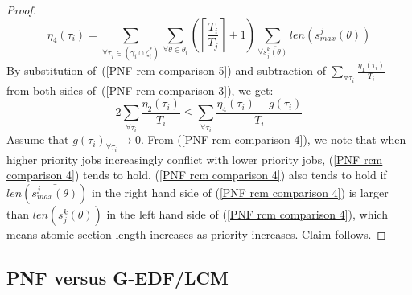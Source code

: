 \documentclass[12pt,english]{report}
\newtheorem{proof}{Proof}
\begin{document}
\begin{proof}
\begin{equation*}
\eta_{4}(\tau_{i})=\sum_{\forall\tau_{j}\in(\gamma_{i}\cap\zeta_{i}^{*})}\sum_{\forall\theta\in\theta_{i}}\left(\left\lceil \frac{T_{i}}{T_{j}}\right\rceil +1\right)\sum_{\forall\bar{s_{j}^{k}(\theta)}}len\left(s_{max}^{j}(\theta)\right)
\end{equation*}
%
By substitution of~(\ref{PNF rcm comparison 5}) and subtraction of $\sum_{\forall \tau_i} \frac{\eta_1 (\tau_i)}{T_i}$ from both sides of~(\ref{PNF rcm comparison 3}), we get:
%
\begin{equation}
2\sum_{\forall\tau_{i}}\frac{\eta_{2}(\tau_{i})}{T_{i}}\le\sum_{\forall\tau_{i}}\frac{\eta_{4}(\tau_{i})+g(\tau_{i})}{T_{i}}
\label{PNF rcm comparison 4}
\end{equation}
%
Assume that $g(\tau_{i})_{\forall\tau_{i}}\rightarrow0$. From (\ref{PNF rcm comparison 4}), we note that when higher priority jobs increasingly conflict with lower priority jobs, (\ref{PNF rcm comparison 4}) tends to hold. (\ref{PNF rcm comparison 4}) also tends to hold if $len(\bar{s_{max}^j(\theta)})$ in the right hand side of (\ref{PNF rcm comparison 4}) is larger than $len(\bar{s_j^k(\theta)})$ in the left hand side of (\ref{PNF rcm comparison 4}), which means atomic section length increases as priority increases. Claim follows.
\end{proof}

\subsection{PNF versus G-EDF/LCM}
\end{document}
